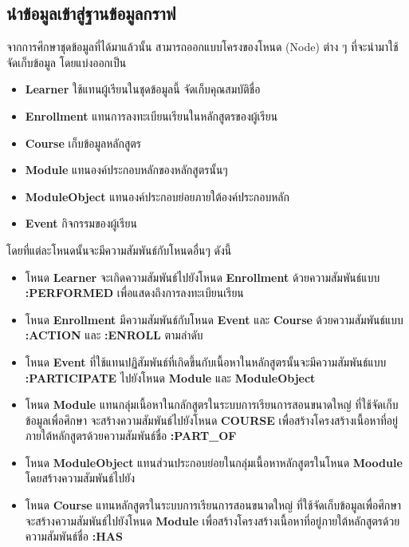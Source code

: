 \documentclass[conference]{IEEEtran}
\def\moocs{การเรียนการสอนขนาดใหญ่}
\def\MOOCs{ระบบ{\moocs}}
\begin{document}
    \subsection{นำข้อมูลเข้าสู่ฐานข้อมูลกราฟ}
    
    จากการศึกษาชุดข้อมูลที่ได้มาแล้วนั้น สามารถออกแบบโครงของโหนด (Node) ต่าง ๆ 
    ที่จะนำมาใช้จัดเก็บข้อมูล โดยแบ่งออกเป็น
    \begin{itemize}
        \item \textbf{Learner} ใช้แทนผู้เรียนในชุดข้อมูลนี้ จัดเก็บคุณสมบัติชื่อ \textbf{}
        \item \textbf{Enrollment} แทนการลงทะเบียนเรียนในหลักสูตรของผู้เรียน
        \item \textbf{Course} เก็บข้อมูลหลักสูตร
        \item \textbf{Module} แทนองค์ประกอบหลักของหลักสูตรนั้นๆ
        \item \textbf{ModuleObject} แทนองค์ประกอบย่อยภายใต้องค์ประกอบหลัก
        \item \textbf{Event} กิจกรรมของผู้เรียน
    \end{itemize}


    โดยที่แต่ละโหนดนั้นจะมีความสัมพันธ์กับโหนดอื่นๆ ดังนี้ 
    \begin{itemize}
        \item โหนด \textbf{Learner} จะเกิดความสัมพันธ์ไปยังโหนด \textbf{Enrollment} ด้วยความสัมพันธ์แบบ \textbf{:PERFORMED} เพื่อแสดงถึงการลงทะเบียนเรียน
        \item โหนด \textbf{Enrollment} มีความสัมพันธ์กับโหนด \textbf{Event} และ \textbf{Course} ด้วยความสัมพันธ์แบบ \textbf{:ACTION} และ \textbf{:ENROLL} ตามลำดับ
        \item โหนด \textbf{Event} ที่ใช้แทนปฏิสัมพันธ์ที่เกิดขึ้นกับเนื้อหาในหลักสูตรนั้นจะมีความสัมพันธ์แบบ \textbf{:PARTICIPATE} ไปยังโหนด \textbf{Module} และ \textbf{ModuleObject}
        \item โหนด \textbf{Module} แทนกลุ่มเนื้อหาในกลักสูตรใน{\MOOCs} ที่ใช้จัดเก็บข้อมูลเพื่อศึกษา จะสร้างความสัมพันธ์ไปยังโหนด \textbf{COURSE} เพื่อสร้างโครงสร้างเนื้อหาที่อยู่ภายใต้หลักสูตรด้วยความสัมพันธ์ชื่อ \textbf{:PART\_OF}
        \item โหนด \textbf{ModuleObject} แทนส่วนประกอบย่อยในกลุ่มเนื้อหาหลักสูตรในโหนด \textbf{Moodule} โดยสร้างความสัมพันธ์ไปยัง
        \item โหนด \textbf{Course} แทนหลักสูตรใน{\MOOCs} ที่ใช้จัดเก็บข้อมูลเพื่อศึกษา จะสร้างความสัมพันธ์ไปยังโหนด \textbf{Module} เพื่อสร้างโครงสร้างเนื้อหาที่อยู่ภายใต้หลักสูตรด้วยความสัมพันธ์ชื่อ \textbf{:HAS}
    \end{itemize}
\end{document}
